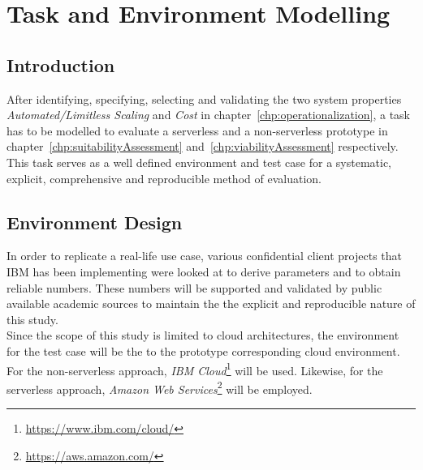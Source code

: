 \chapter{Task and Environment Modelling}\label{chp:environmentTaskModelling}


\section{Introduction}

After identifying, specifying, selecting and validating the two system properties \textit{Automated/Limitless Scaling} and \textit{Cost} in chapter~\vref{chp:operationalization}, a task has to be modelled to evaluate a serverless and a non-serverless prototype in chapter~\vref{chp:suitabilityAssessment} and~\vref{chp:viabilityAssessment} respectively. This task serves as a well defined environment and test case for a systematic, explicit, comprehensive and reproducible method of evaluation. 

\section{Environment Design}

In order to replicate a real-life use case, various confidential client projects that IBM has been implementing were looked at to derive parameters and to obtain reliable numbers. These numbers will be supported and validated by public available academic sources to maintain the the explicit and reproducible nature of this study.\\
Since the scope of this study is limited to cloud architectures, the environment for the test case will be the to the prototype corresponding cloud environment. For the non-serverless approach, \textit{IBM Cloud}\footnote{\url{https://www.ibm.com/cloud/}} will be used. Likewise, for the serverless approach, \textit{Amazon Web Services}\footnote{\url{https://aws.amazon.com/}} will be employed. 


